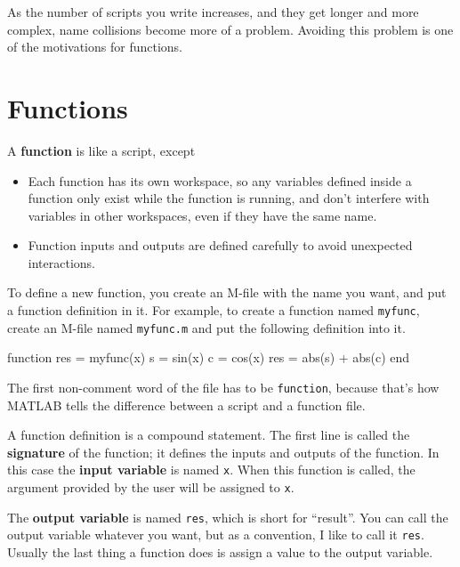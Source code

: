 \documentclass[
]{book}
\numberwithin{Answer}{chapter}
\numberwithin{Exercise}{chapter}
\begin{document}
As the number of scripts you write increases, and they get longer
and more complex, name collisions become more of a problem.  Avoiding
this problem is one of the motivations for functions.


\section{Functions}
\label{sect:functions}

A {\bf function} is like a script, except

\begin{itemize}

\item Each function has its own workspace, so any variables defined
inside a function only exist while the function is running, and don't
interfere with variables in other workspaces, even if they have the
same name.

\item Function inputs and outputs are defined carefully to avoid
unexpected interactions.

\end{itemize}

To define a new function, you create an M-file with the name you
want, and put a function definition in it.  For example, to create
a function named {\tt myfunc}, create an M-file named {\tt myfunc.m}
and put the following definition into it.


\begin{code}
function res = myfunc(x)
    s = sin(x)
    c = cos(x)
    res = abs(s) + abs(c)
end
\end{code}

The first non-comment word of the file has to be {\tt function}, because
that's how MATLAB tells the difference between a script and a function
file.

A function definition is a compound statement.  The first line
is called the {\bf signature} of the function; it defines
the inputs and outputs of the function.  In this case the {\bf input variable} is named {\tt x}.  When this function is called, the
argument provided by the user will be assigned to {\tt x}.

The {\bf output variable} is named {\tt res}, which is short for
``result''.  You can call the output variable whatever you want, but
as a convention, I like to call it {\tt res}.  Usually the last
thing a function does is assign a value to the output variable.
\end{document}
